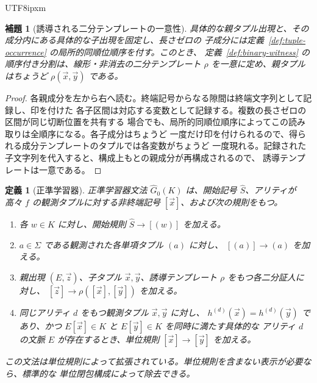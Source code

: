 \documentclass[10pt,a4paper]{article}
\newtheorem{lemma}[theorem]{補題}
\newtheorem{definition}[theorem]{定義}
\theoremstyle{remark}
\newcommand{\tuple}[1]{\vec{#1}}
\begin{document}
\begin{CJK}{UTF8}{ipxm}
\begin{lemma}[誘導される二分テンプレートの一意性]
\label{lem:unique-induced-template}
具体的な親タプル出現と、その成分内にある具体的な子出現を固定し、長さゼロの
子成分には定義~\ref{def:tuple-occurrence} の局所的同順位順序を付す。このとき、
定義~\ref{def:binary-witness} の順序付き分割は、線形・非消去の二分テンプレート
\(\rho\) を一意に定め、親タプルはちょうど \(\rho(\tuple x,\tuple y)\) である。
\end{lemma}

\begin{proof}
各親成分を左から右へ読む。終端記号からなる隙間は終端文字列として記録し、印を付けた
各子区間は対応する変数として記録する。複数の長さゼロの区間が同じ切断位置を共有する
場合でも、局所的同順位順序によってこの読み取りは全順序になる。各子成分はちょうど
一度だけ印を付けられるので、得られる成分テンプレートのタプルでは各変数がちょうど
一度現れる。記録された子文字列を代入すると、構成上もとの親成分が再構成されるので、
誘導テンプレートは一意である。
\end{proof}

\begin{definition}[正準学習器]
\label{def:learner}
正準学習器文法 \(\widehat G_0(K)\) は、開始記号 \(\widehat S\)、アリティが高々
\(f\) の観測タプルに対する非終端記号 \([\tuple x]\)、および次の規則をもつ。
\begin{enumerate}[label=(\roman*),leftmargin=*]
\item 各 \(w\in K\) に対し、開始規則 \(\widehat S\to[(w)]\) を加える。
\item \(a\in\Sigma\) である観測された各単項タプル \((a)\) に対し、
\([(a)]\to(a)\) を加える。
\item 親出現 \((E,\tuple z)\)、子タプル \(\tuple x,\tuple y\)、誘導テンプレート
\(\rho\) をもつ各二分証人に対し、
\([\tuple z]\to\rho([\tuple x],[\tuple y])\) を加える。
\item 同じアリティ \(d\) をもつ観測タプル \(\tuple x,\tuple y\) に対し、
\(h^{(d)}(\tuple x)=h^{(d)}(\tuple y)\) であり、かつ
\(E[\tuple x]\in K\) と \(E[\tuple y]\in K\) を同時に満たす具体的な
アリティ \(d\) の文脈 \(E\) が存在するとき、単位規則
\([\tuple x]\to[\tuple y]\) を加える。
\end{enumerate}
この文法は単位規則によって拡張されている。単位規則を含まない表示が必要なら、標準的な
単位閉包構成によって除去できる。
\end{definition}


\end{CJK}
\end{document}
